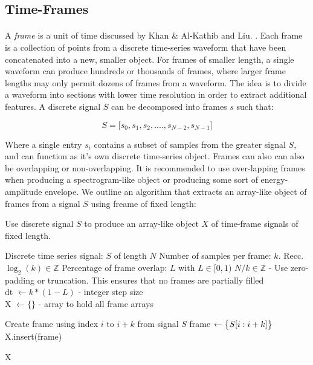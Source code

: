 \documentclass[12pt,letterpaper]{article}
\begin{document}


\subsection{Time-Frames}

\paragraph*{}A \textit{frame} is a unit of time discussed by Khan \& Al-Kathib and Liu.  \cite{Kahn 2006,Liu 1998}. Each frame is a collection of points from a discrete time-series waveform that have been concatenated into a new, smaller object. For frames of smaller length, a single waveform can produce hundreds or thousands of frames, where larger frame lengths may only permit dozens of frames from a waveform. The idea is to divide a waveform into sections with lower time resolution in order to extract additional features. A discrete signal $S$ can be decomposed into frames $s$ such that:

\begin{equation}
\label{many frames}
S = \big[ s_0 , s_1 , s_2 , .... , s_{N-2} , s_{N-1} \big]
\end{equation}

Where a single entry $s_i$ contains a subset of samples from the greater signal $S$, and can function as it's own discrete time-series object. Frames can also can also be overlapping or non-overlapping. It is recommended to use over-lapping frames when producing a spectrogram-like object or producing some sort of energy-amplitude envelope. We outline an algorithm that extracts an array-like object of frames from a signal $S$ using freame of fixed length:

\begin{algorithm}
\label{Time-Frames}
\caption{Use discrete signal $S$ to produce an array-like object $X$ of time-frame signals of fixed length.}
\begin{algorithmic}
\REQUIRE Discrete time series signal: $S$ of length $N$
\REQUIRE Number of samples per frame: $k$. Recc. $\log_2(k) \in \mathbb{Z}$
\REQUIRE Percentage of frame overlap: $L$ with $L \in [0,1)$
\ENSURE $N/k \in \mathbb{Z}$ - Use zero-padding or truncation. This ensures that no frames are partially filled \\
dt $\leftarrow k * (1 - L)$ - integer step size \\
X $\leftarrow \{\}$ - array to hold all frame arrays \\

	\item Create frame using index $i$ to $i+k$ from signal $S$
	\STATE frame $\leftarrow \big{\{} S[i:i+k] \big{\}}$ 
	\STATE X.insert(frame)
\ENDFOR

\RETURN X

\end{algorithmic}
\end{algorithm}
\end{document}
